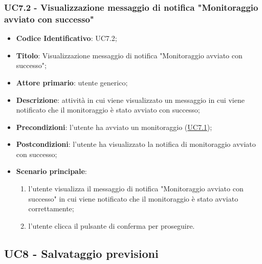	\subsubsection{UC7.2 - Visualizzazione messaggio di notifica "Monitoraggio avviato con successo"}	
		\begin{itemize}
			\item\textbf{Codice Identificativo}: UC7.2;
			\item\textbf{Titolo}: Visualizzazione messaggio di notifica "Monitoraggio avviato con successo";
			\item\textbf{Attore primario}: utente generico;
			\item\textbf{Descrizione}: attività in cui viene visualizzato un messaggio in cui viene notificato che il monitoraggio è stato avviato con successo;
			\item\textbf{Precondizioni}: l'utente ha avviato un monitoraggio (\hyperref[par:UC7.1]{UC7.1});
			\item\textbf{Postcondizioni}: l'utente ha visualizzato la notifica di monitoraggio avviato con successo;
			\item\textbf{Scenario principale}:
				\begin{enumerate}
					\item l'utente visualizza il messaggio di notifica "Monitoraggio avviato con successo" in cui viene notificato che il monitoraggio è stato avviato correttamente;
					\item l'utente clicca il pulsante di conferma per proseguire.		
				\end{enumerate}		
		\end{itemize}
		

\label{par:UC8}
	\subsection{UC8 - Salvataggio previsioni}
	
